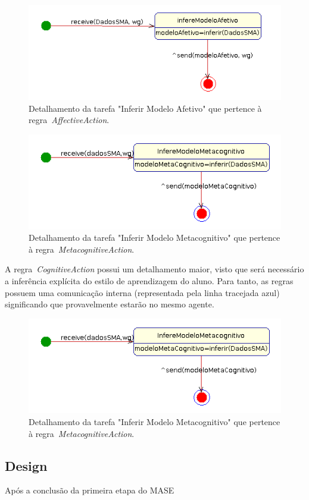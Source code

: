 \begin{figure}
	\centering
	\includegraphics[scale=0.48]{images/td-inferir-afetivo.png}
	\caption{Detalhamento da tarefa "Inferir Modelo Afetivo" que pertence à regra~\emph{AffectiveAction}.}
	\label{fig:td-inferir-afetivo}
\end{figure}

\begin{figure}
	\centering
	\includegraphics[scale=0.48]{images/td-inferir-metacognitivo.png}
	\caption{Detalhamento da tarefa "Inferir Modelo Metacognitivo" que pertence à regra~\emph{MetacognitiveAction}.}
	\label{fig:td-inferir-metacognitivo}
\end{figure}

A regra~\emph{CognitiveAction} possui um detalhamento maior, visto que será necessário a inferência explícita do estilo de aprendizagem do aluno. Para tanto, as regras possuem uma comunicação interna (representada pela linha tracejada azul) significando que provavelmente estarão no mesmo agente.

\begin{figure}
	\centering
	\includegraphics[scale=0.48]{images/td-inferir-metacognitivo.png}
	\caption{Detalhamento da tarefa "Inferir Modelo Metacognitivo" que pertence à regra~\emph{MetacognitiveAction}.}
	\label{fig:td-inferir-metacognitivo}
\end{figure}





\subsection{Design}\label{subsection:design}

Após a conclusão da primeira etapa do MASE
